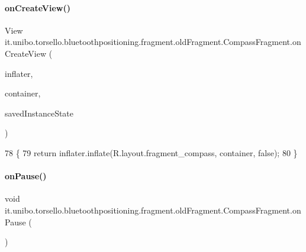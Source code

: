 \paragraph{\texorpdfstring{on\+Create\+View()}{onCreateView()}}
{\footnotesize\ttfamily View it.\+unibo.\+torsello.\+bluetoothpositioning.\+fragment.\+old\+Fragment.\+Compass\+Fragment.\+on\+Create\+View (\begin{DoxyParamCaption}\item[{Layout\+Inflater}]{inflater,  }\item[{View\+Group}]{container,  }\item[{Bundle}]{saved\+Instance\+State }\end{DoxyParamCaption})}


\begin{DoxyCode}
78                                                         \{
79         \textcolor{keywordflow}{return} inflater.inflate(R.layout.fragment\_compass, container, \textcolor{keyword}{false});
80     \}
\end{DoxyCode}
\hypertarget{classit_1_1unibo_1_1torsello_1_1bluetoothpositioning_1_1fragment_1_1oldFragment_1_1CompassFragment_a7f6236f3d95a9279e0c58e88aa2401ed_a7f6236f3d95a9279e0c58e88aa2401ed}{}\label{classit_1_1unibo_1_1torsello_1_1bluetoothpositioning_1_1fragment_1_1oldFragment_1_1CompassFragment_a7f6236f3d95a9279e0c58e88aa2401ed_a7f6236f3d95a9279e0c58e88aa2401ed} 
\paragraph{\texorpdfstring{on\+Pause()}{onPause()}}
{\footnotesize\ttfamily void it.\+unibo.\+torsello.\+bluetoothpositioning.\+fragment.\+old\+Fragment.\+Compass\+Fragment.\+on\+Pause (\begin{DoxyParamCaption}{ }\end{DoxyParamCaption})}


